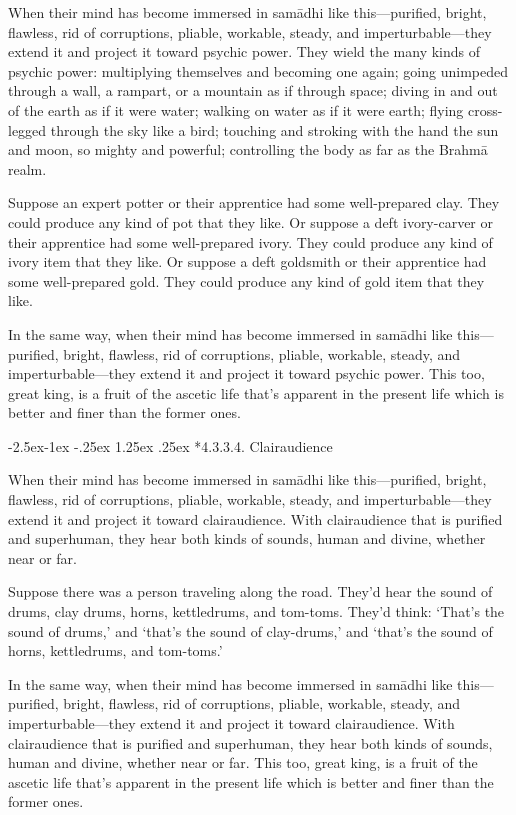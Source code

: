 \documentclass[12pt,openany]{book}%
\makeatletter
\renewcommand\paragraph{\@startsection{paragraph}{4}{\z@}%
            {-2.5ex\@plus -1ex \@minus -.25ex}%
            {1.25ex \@plus .25ex}%
            {\noindent\Semiboldnormalfont\normalsize}}
\makeatother
\begin{document}
When their mind has become immersed in \textsanskrit{samādhi} like this—purified, bright, flawless, rid of corruptions, pliable, workable, steady, and imperturbable—they extend it and project it toward psychic power. They wield the many kinds of psychic power: multiplying themselves and becoming one again; going unimpeded through a wall, a rampart, or a mountain as if through space; diving in and out of the earth as if it were water; walking on water as if it were earth; flying cross-legged through the sky like a bird; touching and stroking with the hand the sun and moon, so mighty and powerful; controlling the body as far as the \textsanskrit{Brahmā} realm. 

Suppose an expert potter or their apprentice had some well-prepared clay. They could produce any kind of pot that they like. Or suppose a deft ivory-carver or their apprentice had some well-prepared ivory. They could produce any kind of ivory item that they like. Or suppose a deft goldsmith or their apprentice had some well-prepared gold. They could produce any kind of gold item that they like. 

In the same way, when their mind has become immersed in \textsanskrit{samādhi} like this—purified, bright, flawless, rid of corruptions, pliable, workable, steady, and imperturbable—they extend it and project it toward psychic power. This too, great king, is a fruit of the ascetic life that’s apparent in the present life which is better and finer than the former ones. 

\paragraph*{4.3.3.4. Clairaudience }

When their mind has become immersed in \textsanskrit{samādhi} like this—purified, bright, flawless, rid of corruptions, pliable, workable, steady, and imperturbable—they extend it and project it toward clairaudience. With clairaudience that is purified and superhuman, they hear both kinds of sounds, human and divine, whether near or far. 

Suppose there was a person traveling along the road. They’d hear the sound of drums, clay drums, horns, kettledrums, and tom-toms. They’d think: ‘That’s the sound of drums,’ and ‘that’s the sound of clay-drums,’ and ‘that’s the sound of horns, kettledrums, and tom-toms.’ 

In the same way, when their mind has become immersed in \textsanskrit{samādhi} like this—purified, bright, flawless, rid of corruptions, pliable, workable, steady, and imperturbable—they extend it and project it toward clairaudience. With clairaudience that is purified and superhuman, they hear both kinds of sounds, human and divine, whether near or far. This too, great king, is a fruit of the ascetic life that’s apparent in the present life which is better and finer than the former ones. 
\end{document}
